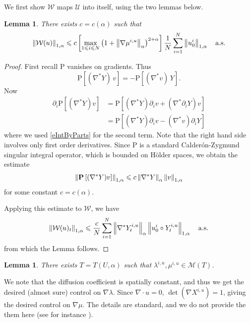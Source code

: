 \documentclass[final]{amsart}%
\newcommand{\del}{\partial}
\newcommand{\transpose}{^*}
\newcommand{\grad}{\nabla}
\newcommand{\gradt}{\grad\transpose}
\newcommand{\divergence}{\grad \cdot}
\renewcommand{\leq}{\leqslant}
\newcommand{\lhp}{\boldsymbol{\mathrm{P}}}
\newcommand{\as}{\text{a.s.}}
\newcommand{\W}{\mathcal{W}}
\newcommand{\U}{\mathcal{U}}
\newcommand{\M}{\mathcal{M}}
\newif\iftextstyle
\newcommand{\norm}[1]{\iftextstyle\lVert#1\rVert\else\left\lVert#1\right\rVert\fi}
\newcommand{\holdernorm}[3]{\norm{#1}_{\ifx0#2{#3}\else{#2,#3}\fi}}
\numberwithin{equation}{section}
\newtheorem{lemma}[theorem]{Lemma}
\theoremstyle{definition}
\theoremstyle{remark}
\begin{document}
We first show $\W$ maps $\U$ into itself, using the two lemmas below.
\begin{lemma}\label{lWbound}%
There exists $c = c(\alpha)$ such that
$$
\holdernorm{\W(u)}{1}{\alpha} \leq c \left[ \max_{1 \leq i \leq N}
  \left(1 + \holdernorm{\grad \mu^{i,u}}{0}{\alpha}\right)^{2+\alpha}
\right] \frac{1}{N} \sum_{i=1}^N \holdernorm{u^i_0}{1}{\alpha}
\quad\as
$$
\end{lemma}%
\begin{proof}%
First recall $\lhp$ vanishes on gradients. Thus
\begin{equation}\label{eIntByParts}
\lhp\left[ (\gradt Y) \, v \right] = - \lhp\left[ (\gradt v) \, Y \right].
\end{equation}
Now
\begin{align*}
  \del_i \lhp\left[ (\gradt Y)v\right] &= \lhp\left[ (\gradt Y) \del_i v + (\gradt \del_i Y) v \right]\\
  &= \lhp\left[ (\gradt Y) \del_i v - (\gradt v) \del_i Y \right]
\end{align*}
where we used \eqref{eIntByParts} for the second term. Note that the
right hand side involves only first order derivatives. Since $\lhp$ is
a standard Calder\'on-Zygmund singular integral operator, which is
bounded on H\"older spaces, we obtain the estimate
$$
\holdernorm{ \lhp\left[ (\gradt Y) v \right] }{1}{\alpha} \leq c
\holdernorm{\gradt Y}{0}{\alpha} \holdernorm{v}{1}{\alpha}
$$
for some constant $c = c(\alpha)$.

Applying this estimate to $\W$, we have
\begin{equation}\label{eWu1}
  \holdernorm{\W(u)_t}{1}{\alpha} \leq \frac{c}{N} \sum_{i=1}^N
  \holdernorm{\gradt Y^{i,u}_t}{0}{\alpha} \holdernorm{ u^i_0 \circ
    Y^{i,u}_t }{1}{\alpha}\quad\as 
\end{equation}
from which the Lemma follows.
\end{proof}%
\begin{lemma}\label{lLambdaMuBound}%
There exists $T = T(U, \alpha)$ such that $\lambda^{i,u}, \mu^{i,u} \in \M(T)$.
\end{lemma}%

We note that the diffusion coefficient is spatially constant, and thus
we get the desired (almost sure) control on $\grad \lambda$. Since
$\divergence u = 0$, $\det(\grad X^{i,u}) = 1$, giving the desired
control on $\grad \mu$. The details are standard, and we do not
provide the them here (see for instance
\cites{sperturb,kunita}).\medskip
\end{document}
